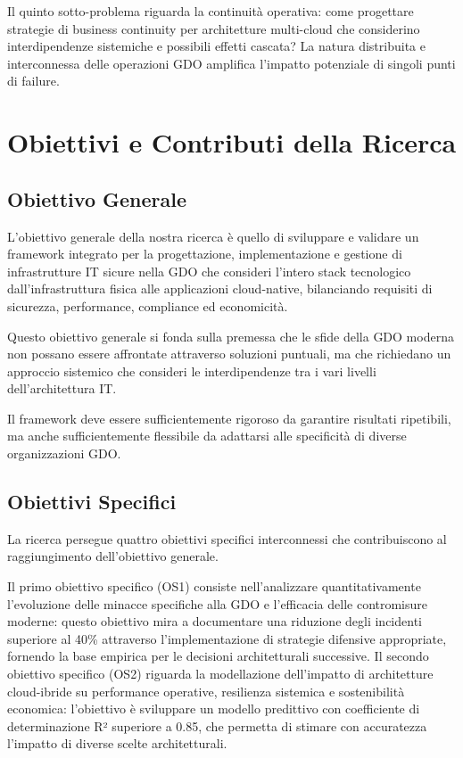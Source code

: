\documentclass[12pt,a4paper,oneside]{book}
\begin{document}
Il quinto sotto-problema riguarda la continuità operativa: come
progettare strategie di business continuity per architetture multi-cloud
che considerino interdipendenze sistemiche e possibili effetti cascata?
La natura distribuita e interconnessa delle operazioni GDO amplifica
l'impatto potenziale di singoli punti di failure.

\section{\texorpdfstring{\textbf{Obiettivi e Contributi della
Ricerca}}{1.3 Obiettivi e Contributi della Ricerca}}\label{obiettivi-e-contributi-della-ricerca}

\subsection{\texorpdfstring{\textbf{Obiettivo
Generale}}{1.3.1 Obiettivo Generale}}\label{obiettivo-generale}

L'obiettivo generale della nostra ricerca è quello di sviluppare e
validare un framework integrato per la progettazione, implementazione e
gestione di infrastrutture IT sicure nella GDO che consideri l'intero
stack tecnologico dall'infrastruttura fisica alle applicazioni
cloud-native, bilanciando requisiti di sicurezza, performance,
compliance ed economicità.

Questo obiettivo generale si fonda sulla premessa che le sfide della GDO
moderna non possano essere affrontate attraverso soluzioni puntuali, ma
che richiedano un approccio sistemico che consideri le interdipendenze
tra i vari livelli dell'architettura IT.

Il framework deve essere sufficientemente rigoroso da garantire
risultati ripetibili, ma anche sufficientemente flessibile da adattarsi
alle specificità di diverse organizzazioni GDO.

\subsection{\texorpdfstring{\textbf{Obiettivi
Specifici}}{1.3.2 Obiettivi Specifici}}\label{obiettivi-specifici}

La ricerca persegue quattro obiettivi specifici interconnessi che
contribuiscono al raggiungimento dell'obiettivo generale.

Il primo obiettivo specifico (OS1) consiste nell'analizzare
quantitativamente l'evoluzione delle minacce specifiche alla GDO e
l'efficacia delle contromisure moderne: questo obiettivo mira a
documentare una riduzione degli incidenti superiore al 40\% attraverso l'implementazione di strategie difensive appropriate, fornendo la base empirica per le decisioni architetturali successive.
Il secondo obiettivo specifico (OS2) riguarda la modellazione
dell'impatto di architetture cloud-ibride su performance operative, resilienza sistemica e sostenibilità economica: l'obiettivo è sviluppare un modello predittivo con coefficiente di determinazione R² superiore a 0.85, che permetta di stimare con accuratezza l'impatto di diverse scelte architetturali.
\end{document}
